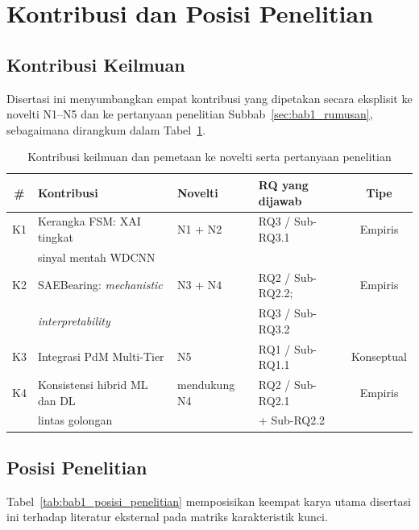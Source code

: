 \section{Kontribusi dan Posisi Penelitian}
\label{sec:bab1_kontribusi}

\subsection*{Kontribusi Keilmuan}

Disertasi ini menyumbangkan empat kontribusi yang dipetakan secara
eksplisit ke novelti N1–N5 dan ke pertanyaan penelitian
Subbab~\ref{sec:bab1_rumusan}, sebagaimana dirangkum dalam
Tabel~\ref{tab:bab1_kontribusi}.

\begin{table}[ht]
  \centering
  \caption{Kontribusi keilmuan dan pemetaan ke novelti serta pertanyaan penelitian}
  \label{tab:bab1_kontribusi}
  \footnotesize
  \begin{tabular}{@{}clp{3.2cm}p{4.5cm}c@{}}
    \hline
    \textbf{\#} & \textbf{Kontribusi} & \textbf{Novelti} &
    \textbf{RQ yang dijawab} & \textbf{Tipe} \\
    \hline
    K1 & Kerangka FSM: XAI tingkat & N1 + N2 & RQ3 / Sub-RQ3.1 & Empiris \\
       & sinyal mentah WDCNN & & & \\
    K2 & SAEBearing: \emph{mechanistic} & N3 + N4 &
       RQ2 / Sub-RQ2.2; & Empiris \\
       & \emph{interpretability} & & RQ3 / Sub-RQ3.2 & \\
    K3 & Integrasi PdM Multi-Tier & N5 & RQ1 / Sub-RQ1.1 & Konseptual \\
    K4 & Konsistensi hibrid ML dan DL & mendukung N4 &
       RQ2 / Sub-RQ2.1 & Empiris \\
       & lintas golongan & & + Sub-RQ2.2 & \\
    \hline
  \end{tabular}
\end{table}

\subsection*{Posisi Penelitian}

Tabel~\ref{tab:bab1_posisi_penelitian} memposisikan keempat karya
utama disertasi ini terhadap literatur eksternal pada matriks
karakteristik kunci.

